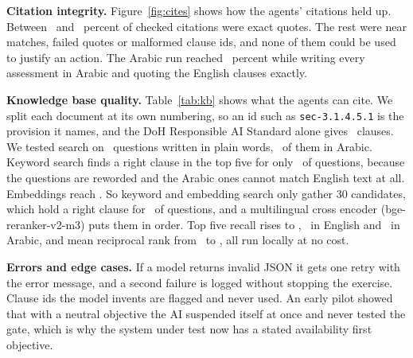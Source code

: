 \documentclass[10pt,twocolumn]{article}
\begin{document}
\textbf{Citation integrity.} Figure~\ref{fig:cites} shows how the agents' citations held up. Between \VerifMin\ and \VerifMax\ percent of checked citations were exact quotes. The rest were near matches, failed quotes or malformed clause ids, and none of them could be used to justify an action. The Arabic run reached \ArVerif\ percent while writing every assessment in Arabic and quoting the English clauses exactly.

\par\medskip\noindent\begin{minipage}{\columnwidth}\centering

\label{fig:cites}
\end{minipage}\par\medskip


\textbf{Knowledge base quality.} Table~\ref{tab:kb} shows what the agents can cite. We split each document at its own numbering, so an id such as \texttt{sec-3.1.4.5.1} is the provision it names, and the DoH Responsible AI Standard alone gives \KBDohRaiClauses\ clauses. We tested search on \EvalN\ questions written in plain words, \EvalNAr\ of them in Arabic. Keyword search finds a right clause in the top five for only \RecallBM\ of questions, because the questions are reworded and the Arabic ones cannot match English text at all. Embeddings reach \RecallDense. So keyword and embedding search only gather 30 candidates, which hold a right clause for \PoolRecall\ of questions, and a multilingual cross encoder (bge\mbox{-}reranker\mbox{-}v2\mbox{-}m3) puts them in order. Top five recall rises to \RecallRerank, \RecallRerankEn\ in English and \RecallRerankAr\ in Arabic, and mean reciprocal rank from \MRRDense\ to \MRRRerank, all run locally at no cost.

\par\medskip\noindent\begin{minipage}{\columnwidth}\centering\footnotesize

\label{tab:kb}
\end{minipage}\par\medskip

\textbf{Errors and edge cases.} If a model returns invalid JSON it gets one retry with the error message, and a second failure is logged without stopping the exercise. Clause ids the model invents are flagged and never used. An early pilot showed that with a neutral objective the AI suspended itself at once and never tested the gate, which is why the system under test now has a stated availability first objective.
\end{document}
